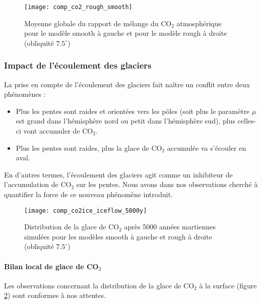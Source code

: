 \documentclass[11pt,a4paper]{article}
\begin{document}
\begin{figure}[h!]
\begin{center}
\texttt{[image: comp\_co2\_rough\_smooth]}
\caption{Moyenne globale du rapport de mélange du CO$_2$ atmosphérique pour le modèle smooth à gauche et pour le modèle rough à droite (obliquité $7.5^\circ$)}
\label{comp_co2_rough_smooth}
\end{center}
\end{figure}

\subsubsection{Impact de l'écoulement des glaciers}
La prise en compte de l'écoulement des glaciers fait naître un conflit entre deux phénomènes :
\begin{itemize}
\item Plus les pentes sont raides et orientées vers les pôles (soit plus le paramètre $\mu$ est grand dans l'hémisphère nord ou petit dans l'hémisphère sud), plus celles-ci vont accumuler de CO$_2$.
\item Plus les pentes sont raides, plus la glace de CO$_2$ accumulée va s'écouler en aval. \\
\end{itemize}
En d'autres termes, l'écoulement des glaciers agit comme un inhibiteur de l'accumulation de CO$_2$ sur les pentes. Nous avons dans nos observations cherché à quantifier la force de ce nouveau phénomène introduit. \\

\begin{figure}[h!]
\begin{center}
\texttt{[image: comp\_co2ice\_iceflow\_5000y]}
\caption{Distribution de la glace de CO$_2$ après 5000 années martiennes simulées pour les modèles smooth à gauche et rough à droite (obliquité $7.5^\circ$)}
\label{comp_co2ice_iceflow_5000y}
\end{center}
\end{figure}

\paragraph{Bilan local de glace de CO$_2$ \\}
Les observations concernant la distribution de la glace de CO$_2$ à la surface  (figure \ref{comp_co2ice_iceflow_5000y}) sont conformes à nos attentes. 
\end{document}
